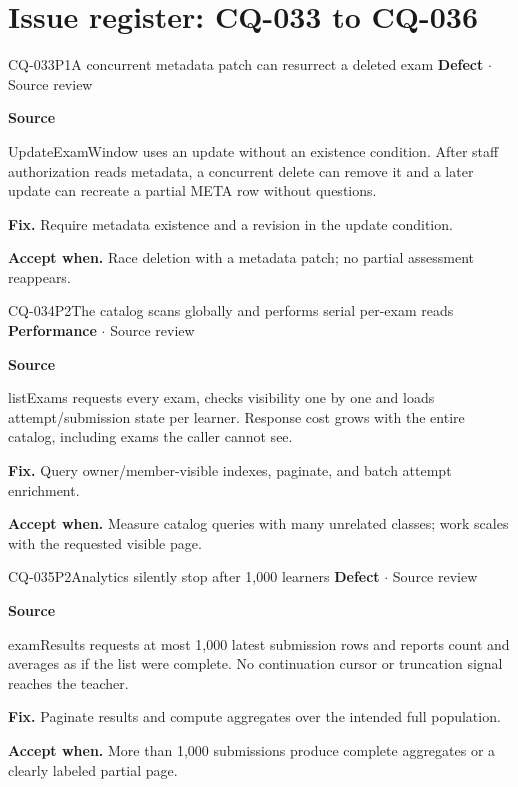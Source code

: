 \section*{Issue register: CQ-033 to CQ-036}
\begin{finding}{CQ-033}{P1}{A concurrent metadata patch can resurrect a deleted exam}
\textbf{Defect} $\cdot$ Source review\par
\textbf{Source}\quad{}\par
UpdateExamWindow uses an update without an existence condition. After staff authorization reads metadata, a concurrent delete can remove it and a later update can recreate a partial META row without questions.\par
\textbf{Fix.} Require metadata existence and a revision in the update condition.\par
\textbf{Accept when.} Race deletion with a metadata patch; no partial assessment reappears.
\end{finding}
\begin{finding}{CQ-034}{P2}{The catalog scans globally and performs serial per-exam reads}
\textbf{Performance} $\cdot$ Source review\par
\textbf{Source}\quad{}\par
listExams requests every exam, checks visibility one by one and loads attempt/submission state per learner. Response cost grows with the entire catalog, including exams the caller cannot see.\par
\textbf{Fix.} Query owner/member-visible indexes, paginate, and batch attempt enrichment.\par
\textbf{Accept when.} Measure catalog queries with many unrelated classes; work scales with the requested visible page.
\end{finding}
\begin{finding}{CQ-035}{P2}{Analytics silently stop after 1,000 learners}
\textbf{Defect} $\cdot$ Source review\par
\textbf{Source}\quad{}\par
examResults requests at most 1,000 latest submission rows and reports count and averages as if the list were complete. No continuation cursor or truncation signal reaches the teacher.\par
\textbf{Fix.} Paginate results and compute aggregates over the intended full population.\par
\textbf{Accept when.} More than 1,000 submissions produce complete aggregates or a clearly labeled partial page.
\end{finding}
